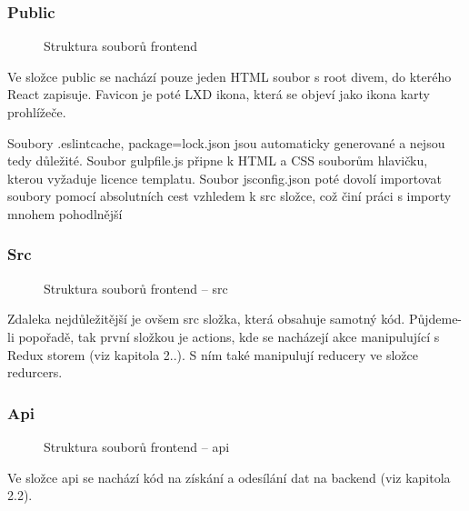 \documentclass[a4paper,oneside,12pt]{report}
\begin{document}
\subsubsection{Public}
\begin{figure}[h]
	\caption[Struktura souborů frontendu, vlastní tvorba]{Struktura souborů frontend}
	\label{fig:frontendStructure}
\end{figure}
Ve složce public se nachází pouze jeden HTML soubor s root divem, do kterého React zapisuje.
Favicon je poté LXD ikona, která se objeví jako ikona karty prohlížeče.

Soubory .eslintcache, package=lock.json jsou automaticky generované a nejsou tedy důležité.
Soubor gulpfile.js připne k HTML a CSS souborům hlavičku, kterou vyžaduje licence templatu.
Soubor jsconfig.json poté dovolí importovat soubory pomocí absolutních cest vzhledem k src složce, což činí práci s importy mnohem pohodlnější

\subsubsection{Src}
\begin{figure}[h]
	\caption[Struktura souborů frontendu, vlastní tvorba -- src]{Struktura souborů frontend -- src}
	\label{fig:frontendStructureSrc}
\end{figure}
Zdaleka nejdůležitější je ovšem src složka, která obsahuje samotný kód.
Půjdeme-li popořadě, tak první složkou je actions, kde se nacházejí akce manipulující s Redux storem (viz kapitola 2..).
S ním také manipulují reducery ve složce redurcers.


\newpage
\subsubsection{Api}


\begin{figure}[h]
	\caption[Struktura souborů frontendu -- api, vlastní tvorba]{Struktura souborů frontend -- api}
	\label{fig:frontendStructureApi}
\end{figure}
Ve složce api se nachází kód na získání a odesílání dat na backend (viz kapitola 2.2).
\end{document}
